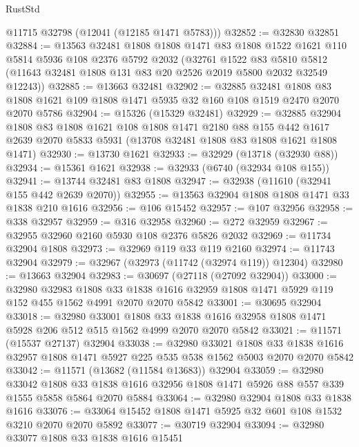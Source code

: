 \begin{lexlean}{RustStd}
\begin{coremodule}
      @11715
      @32798
      (@12041 (@12185 @1471 @5783)))
@32852 := @32830 @32851
@32884 := @13563
    @32481
    @1808
    @1808
    @1471
    @83
    @1808
    @1522
    @1621
    @110
    @5814
    @5936
    @108
    @2376
    @5792
    @2032
    (@32761
      @1522
      @83
      @5810
      @5812
      (@11643 @32481 @1808 @131 @83 @20 @2526 @2019 @5800 @2032 @32549 @12243))
@32885 := @13663 @32481
@32902 := @32885
    @32481
    @1808
    @83
    @1808
    @1621
    @109
    @1808
    @1471
    @5935
    @32
    @160
    @108
    @1519
    @2470
    @2070
    @2070
    @5786
@32904 := @15326 (@15329 @32481)
@32929 := @32885
    @32904
    @1808
    @83
    @1808
    @1621
    @108
    @1808
    @1471
    @2180
    @88
    @155
    @442
    @1617
    @2639
    @2070
    @5833
    @5931
    (@13708 @32481 @1808 @83 @1808 @1621 @1808 @1471)
@32930 := @13730 @1621
@32933 := @32929 (@13718 (@32930 @88))
@32934 := @15361 @1621
@32938 := @32933 (@6740 (@32934 @108 @155))
@32941 := @13744 @32481 @83 @1808
@32947 := @32938 (@11610 (@32941 @155 @442 @2639 @2070))
@32955 := @13563 @32904 @1808 @1808 @1471 @33 @1838 @210 @1616
@32956 := @106 @15452
@32957 := @107 @32956
@32958 := @338 @32957
@32959 := @316 @32958
@32960 := @272 @32959
@32967 := @32955 @32960 @2160 @5930 @108 @2376 @5826 @2032
@32969 := @11734 @32904 @1808
@32973 := @32969 @119 @33 @119 @2160
@32974 := @11743 @32904
@32979 := @32967 (@32973 (@11742 (@32974 @119)) @12304)
@32980 := @13663 @32904
@32983 := @30697 (@27118 (@27092 @32904))
@33000 := @32980
    @32983
    @1808
    @33
    @1838
    @1616
    @32959
    @1808
    @1471
    @5929
    @119
    @152
    @455
    @1562
    @4991
    @2070
    @2070
    @5842
@33001 := @30695 @32904
@33018 := @32980
    @33001
    @1808
    @33
    @1838
    @1616
    @32958
    @1808
    @1471
    @5928
    @206
    @512
    @515
    @1562
    @4999
    @2070
    @2070
    @5842
@33021 := @11571 (@15537 @27137) @32904
@33038 := @32980
    @33021
    @1808
    @33
    @1838
    @1616
    @32957
    @1808
    @1471
    @5927
    @225
    @535
    @538
    @1562
    @5003
    @2070
    @2070
    @5842
@33042 := @11571 (@13682 (@11584 @13683)) @32904
@33059 := @32980
    @33042
    @1808
    @33
    @1838
    @1616
    @32956
    @1808
    @1471
    @5926
    @88
    @557
    @339
    @1555
    @5858
    @5864
    @2070
    @5884
@33064 := @32980 @32904 @1808 @33 @1838 @1616
@33076 := @33064 @15452 @1808 @1471 @5925 @32 @601 @108 @1532 @3210 @2070 @2070 @5892
@33077 := @30719 @32904
@33094 := @32980
    @33077
    @1808
    @33
    @1838
    @1616
    @15451

\end{coremodule}
\end{lexlean}
